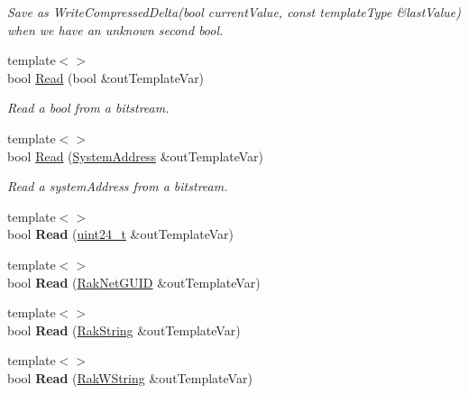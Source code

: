 \begin{DoxyCompactItemize}
\begin{DoxyCompactList}\small\item\em Save as Write\-Compressed\-Delta(bool current\-Value, const template\-Type \&last\-Value) when we have an unknown second bool. \end{DoxyCompactList}\item 
{\footnotesize template$<$$>$ }\\bool \hyperlink{class_rak_net_1_1_bit_stream_aa93e4e7cc020377abccf312a0a35029c}{Read} (bool \&out\-Template\-Var)
\begin{DoxyCompactList}\small\item\em Read a bool from a bitstream. \end{DoxyCompactList}\item 
{\footnotesize template$<$$>$ }\\bool \hyperlink{class_rak_net_1_1_bit_stream_a4e8909d80334b1db974de6942e33a563}{Read} (\hyperlink{struct_rak_net_1_1_system_address}{System\-Address} \&out\-Template\-Var)
\begin{DoxyCompactList}\small\item\em Read a system\-Address from a bitstream. \end{DoxyCompactList}\item 
\hypertarget{class_rak_net_1_1_bit_stream_a63cfda84084d613918380ddc57ee7e4a}{{\footnotesize template$<$$>$ }\\bool {\bfseries Read} (\hyperlink{struct_rak_net_1_1uint24__t}{uint24\-\_\-t} \&out\-Template\-Var)}\label{class_rak_net_1_1_bit_stream_a63cfda84084d613918380ddc57ee7e4a}

\item 
\hypertarget{class_rak_net_1_1_bit_stream_af2b1eda539a0d15a150c398c19fe2ea4}{{\footnotesize template$<$$>$ }\\bool {\bfseries Read} (\hyperlink{struct_rak_net_1_1_rak_net_g_u_i_d}{Rak\-Net\-G\-U\-I\-D} \&out\-Template\-Var)}\label{class_rak_net_1_1_bit_stream_af2b1eda539a0d15a150c398c19fe2ea4}

\item 
\hypertarget{class_rak_net_1_1_bit_stream_a9cd86788d7b7da11a72a9f3a4e6b7d1c}{{\footnotesize template$<$$>$ }\\bool {\bfseries Read} (\hyperlink{class_rak_net_1_1_rak_string}{Rak\-String} \&out\-Template\-Var)}\label{class_rak_net_1_1_bit_stream_a9cd86788d7b7da11a72a9f3a4e6b7d1c}

\item 
\hypertarget{class_rak_net_1_1_bit_stream_a3ca6e41336ea252592d14f4a01974e24}{{\footnotesize template$<$$>$ }\\bool {\bfseries Read} (\hyperlink{class_rak_net_1_1_rak_w_string}{Rak\-W\-String} \&out\-Template\-Var)}\label{class_rak_net_1_1_bit_stream_a3ca6e41336ea252592d14f4a01974e24}


\end{DoxyCompactItemize}
